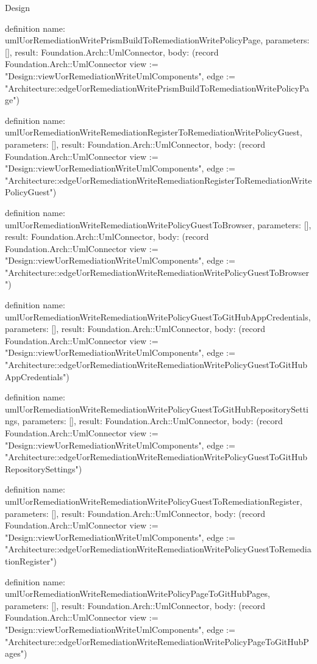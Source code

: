 \begin{lexlean}{Design}
\begin{semanticmodule}
definition{
  name: umlUorRemediationWritePrismBuildToRemediationWritePolicyPage,
  parameters: [],
  result: Foundation.Arch::UmlConnector,
  body: (record Foundation.Arch::UmlConnector {view := "Design::viewUorRemediationWriteUmlComponents", edge := "Architecture::edgeUorRemediationWritePrismBuildToRemediationWritePolicyPage"})
}

definition{
  name: umlUorRemediationWriteRemediationRegisterToRemediationWritePolicyGuest,
  parameters: [],
  result: Foundation.Arch::UmlConnector,
  body: (record Foundation.Arch::UmlConnector {view := "Design::viewUorRemediationWriteUmlComponents", edge := "Architecture::edgeUorRemediationWriteRemediationRegisterToRemediationWritePolicyGuest"})
}

definition{
  name: umlUorRemediationWriteRemediationWritePolicyGuestToBrowser,
  parameters: [],
  result: Foundation.Arch::UmlConnector,
  body: (record Foundation.Arch::UmlConnector {view := "Design::viewUorRemediationWriteUmlComponents", edge := "Architecture::edgeUorRemediationWriteRemediationWritePolicyGuestToBrowser"})
}

definition{
  name: umlUorRemediationWriteRemediationWritePolicyGuestToGitHubAppCredentials,
  parameters: [],
  result: Foundation.Arch::UmlConnector,
  body: (record Foundation.Arch::UmlConnector {view := "Design::viewUorRemediationWriteUmlComponents", edge := "Architecture::edgeUorRemediationWriteRemediationWritePolicyGuestToGitHubAppCredentials"})
}

definition{
  name: umlUorRemediationWriteRemediationWritePolicyGuestToGitHubRepositorySettings,
  parameters: [],
  result: Foundation.Arch::UmlConnector,
  body: (record Foundation.Arch::UmlConnector {view := "Design::viewUorRemediationWriteUmlComponents", edge := "Architecture::edgeUorRemediationWriteRemediationWritePolicyGuestToGitHubRepositorySettings"})
}

definition{
  name: umlUorRemediationWriteRemediationWritePolicyGuestToRemediationRegister,
  parameters: [],
  result: Foundation.Arch::UmlConnector,
  body: (record Foundation.Arch::UmlConnector {view := "Design::viewUorRemediationWriteUmlComponents", edge := "Architecture::edgeUorRemediationWriteRemediationWritePolicyGuestToRemediationRegister"})
}

definition{
  name: umlUorRemediationWriteRemediationWritePolicyPageToGitHubPages,
  parameters: [],
  result: Foundation.Arch::UmlConnector,
  body: (record Foundation.Arch::UmlConnector {view := "Design::viewUorRemediationWriteUmlComponents", edge := "Architecture::edgeUorRemediationWriteRemediationWritePolicyPageToGitHubPages"})
}


\end{semanticmodule}
\end{lexlean}
